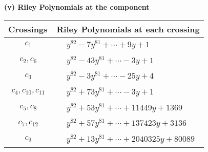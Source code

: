 \documentclass[1p]{elsarticle_modified}
\theoremstyle{definition}
\begin{document}
\newpage\renewcommand{\arraystretch}{1}
\flushleft \textbf{(v) Riley Polynomials at the component}\newline \\
\begin{tabular}{m{50pt}|m{274pt}}
Crossings & \hspace{64pt}Riley Polynomials at each crossing \\
\hline $$\begin{aligned}c_{1}\end{aligned}$$&$\begin{aligned}
&y^{82}-7 y^{81}+\cdots+9 y+1
\end{aligned}$\\
\hline $$\begin{aligned}c_{2},c_{6}\end{aligned}$$&$\begin{aligned}
&y^{82}-43 y^{81}+\cdots-3 y+1
\end{aligned}$\\
\hline $$\begin{aligned}c_{3}\end{aligned}$$&$\begin{aligned}
&y^{82}-3 y^{81}+\cdots-25 y+4
\end{aligned}$\\
\hline $$\begin{aligned}c_{4},c_{10},c_{11}\end{aligned}$$&$\begin{aligned}
&y^{82}+73 y^{81}+\cdots-3 y+1
\end{aligned}$\\
\hline $$\begin{aligned}c_{5},c_{8}\end{aligned}$$&$\begin{aligned}
&y^{82}+53 y^{81}+\cdots+11449 y+1369
\end{aligned}$\\
\hline $$\begin{aligned}c_{7},c_{12}\end{aligned}$$&$\begin{aligned}
&y^{82}+57 y^{81}+\cdots+137423 y+3136
\end{aligned}$\\
\hline $$\begin{aligned}c_{9}\end{aligned}$$&$\begin{aligned}
&y^{82}+13 y^{81}+\cdots+2040325 y+80089
\end{aligned}$\\
\hline
\end{tabular}\\~\\
\end{document}
